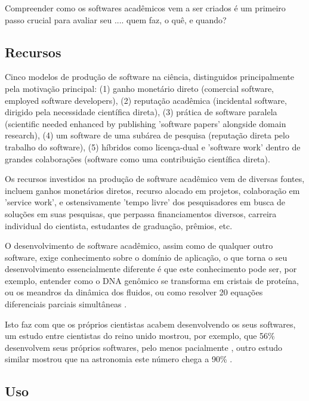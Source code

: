 Compreender como os softwares acadêmicos vem a ser criados é um primeiro
passo crucial para avaliar seu .... quem faz, o quê, e quando?

\subsection{Recursos}

Cinco modelos de produção de software na ciência, distinguidos principalmente
pela motivação principal: (1) ganho monetário direto (comercial software,
employed software developers), (2) reputação acadêmica (incidental software,
dirigido pela necessidade científica direta), (3) prática de software paralela
(scientific needed enhanced by publishing 'software papers' alongside domain research),
(4) um software de uma subárea de pesquisa (reputação direta pelo trabalho do software),
(5) híbridos como licença-dual e 'software work' dentro de grandes colaborações
(software como uma contribuição científica direta).

Os recursos investidos na produção de software acadêmico vem de diversas
fontes, incluem ganhos monetários diretos, recurso alocado em projetos,
colaboração em 'service work', e ostensivamente 'tempo livre' dos pesquisadores
em busca de soluções em suas pesquisas, que perpassa financiamentos diversos,
carreira individual do cientista, estudantes de graduação, prêmios, etc.

O desenvolvimento de software acadêmico, assim como de qualquer outro
software, exige conhecimento sobre o domínio de aplicação, o que torna o
seu desenvolvimento essencialmente diferente é que este conhecimento pode ser,
por exemplo, entender como o DNA genômico se transforma em cristais de
proteína, ou os meandros da dinâmica dos fluidos, ou como resolver 20 equações
diferenciais parciais simultâneas \cite{segal2008developing}.

Isto faz com que os próprios cientistas acabem desenvolvendo os seus softwares,
um estudo entre cientistas do reino unido mostrou, por exemplo, que 56\%
desenvolvem seus próprios softwares, pelo menos pacialmente
\cite{hettrick_2014_14809}, outro estudo similar mostrou que na astronomia este
número chega a 90\% \cite{momcheva2015software}.

\subsection{Uso}


